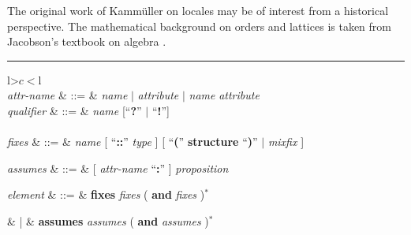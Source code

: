 \begin{isabellebody}
\begin{isamarkuptext}
  The original work of Kamm\"uller on locales \cite{KammullerEtAl1999}
  may be of interest from a historical perspective.  The mathematical
  background on orders and lattices is taken from Jacobson's textbook
  on algebra \cite[Chapter~8]{Jacobson1985}.%
\end{isamarkuptext}%
\isamarkuptrue%
%
\begin{isamarkuptext}%
\begin{table}
\hrule
\vspace{2ex}
\begin{center}
\begin{tabular}{l>$c<$l}
   \\

  \textit{attr-name} & ::=
  & \textit{name} $|$ \textit{attribute} $|$
    \textit{name} \textit{attribute} \\
  \textit{qualifier} & ::=
  & \textit{name} [``\textbf{?}'' $|$ ``\textbf{!}''] \\[2ex]

   \\

  \textit{fixes} & ::=
  & \textit{name} [ ``\textbf{::}'' \textit{type} ]
    [ ``\textbf{(}'' \textbf{structure} ``\textbf{)}'' $|$
    \textit{mixfix} ] \\
\begin{comment}
  \textit{constrains} & ::=
  & \textit{name} ``\textbf{::}'' \textit{type} \\
\end{comment}
  \textit{assumes} & ::=
  & [ \textit{attr-name} ``\textbf{:}'' ] \textit{proposition} \\
\begin{comment}
  \textit{defines} & ::=
  & [ \textit{attr-name} ``\textbf{:}'' ] \textit{proposition} \\
  \textit{notes} & ::=
  & [ \textit{attr-name} ``\textbf{=}'' ]
    ( \textit{qualified-name} [ \textit{attribute} ] )$^+$ \\
\end{comment}

  \textit{element} & ::=
  & \textbf{fixes} \textit{fixes} ( \textbf{and} \textit{fixes} )$^*$ \\
\begin{comment}
  & |
  & \textbf{constrains} \textit{constrains}
    ( \textbf{and} \textit{constrains} )$^*$ \\
\end{comment}
  & |
  & \textbf{assumes} \textit{assumes} ( \textbf{and} \textit{assumes} )$^*$ \\[2ex]


\end{tabular}
\end{center}
\end{table}
\end{isamarkuptext}
\end{isabellebody}
